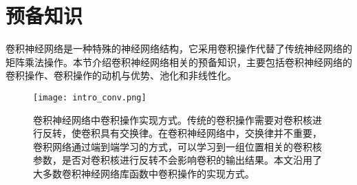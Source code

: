 %

\section{预备知识}

卷积神经网络是一种特殊的神经网络结构，它采用卷积操作代替了传统神经网络的矩阵乘法操作。本节介绍卷积神经网络相关的预备知识，主要包括卷积神经网络的卷积操作、卷积操作的动机与优势、池化和非线性化。

\begin{figure}[h]
\centering
\texttt{[image: intro\_conv.png]}
\caption{卷积神经网络中卷积操作实现方式。传统的卷积操作需要对卷积核进行反转，使卷积具有交换律。在卷积神经网络中，交换律并不重要，卷积网络通过端到端学习的方式，可以学习到一组位置相关的卷积核参数，是否对卷积核进行反转不会影响卷积的输出结果。本文沿用了大多数卷积神经网络库函数中卷积操作的实现方式。}
\label{fig:intro_conv}
\end{figure}

